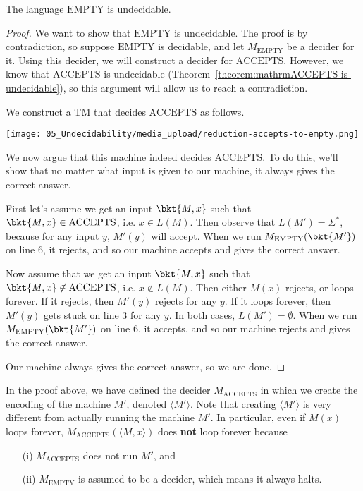 \begin{flex}
\begin{theorem} \label{theorem:mathrmEMPTY-is-undecidable}
The language $\mathrm{EMPTY}$ is undecidable.
\end{theorem}

\begin{proof}
We want to show that $\text{EMPTY}$ is undecidable. The proof is by contradiction, so suppose $\text{EMPTY}$ is decidable, and let $M_\text{EMPTY}$ be a decider for it. Using this decider, we will construct a decider for $\text{ACCEPTS}$. However, we know that $\text{ACCEPTS}$ is undecidable (Theorem~\ref{theorem:mathrmACCEPTS-is-undecidable}), so this argument will allow us to reach a contradiction.

We construct a TM that decides $\text{ACCEPTS}$ as follows.

\begin{center}
\texttt{[image: 05\_Undecidability/media\_upload/reduction-accepts-to-empty.png]}
\end{center}

We now argue that this machine indeed decides $\text{ACCEPTS}$. To do this, we'll show that no matter what input is given to our machine, it always gives the correct answer. 

First let's assume we get an input $\bkt{M,x}$ such that $\bkt{M,x} \in \text{ACCEPTS}$, i.e. $x \in L(M)$. Then observe that $L(M') = \Sigma^*$, because for any input $y$, $M'(y)$ will accept. When we run $M_\text{EMPTY}(\bkt{M'})$ on line 6, it rejects, and so our machine accepts and gives the correct answer. 

Now assume that we get an input $\bkt{M,x}$ such that $\bkt{M,x} \not \in \text{ACCEPTS}$, i.e. $x \not \in L(M)$. Then either $M(x)$ rejects, or loops forever. If it rejects, then $M'(y)$ rejects for any $y$. If it loops forever, then $M'(y)$ gets stuck on line 3 for any $y$. In both cases, $L(M') = \emptyset$. When we run $M_\text{EMPTY}(\bkt{M'})$ on line 6, it accepts, and so our machine rejects and gives the correct answer. 

Our machine always gives the correct answer, so we are done.
\end{proof}
\end{flex}


\begin{note} \label{note:Creating-an-encoding-of-a-machine-vs-running-it}
In the proof above, we have defined the decider $M_\text{ACCEPTS}$ in which we create the encoding of the machine $M'$, denoted $\langle M' \rangle$. Note that creating $\langle M' \rangle$ is very different from actually running the machine $M'$. In particular, even if $M(x)$ loops forever, $M_\text{ACCEPTS}(\langle M,x \rangle)$ does \textbf{not} loop forever because 
\begin{enumerate}
    \item[(i)] $M_\text{ACCEPTS}$ does not run $M'$, and
    \item[(ii)] $M_\text{EMPTY}$ is assumed to be a decider, which means it always halts.
\end{enumerate}
\end{note}


